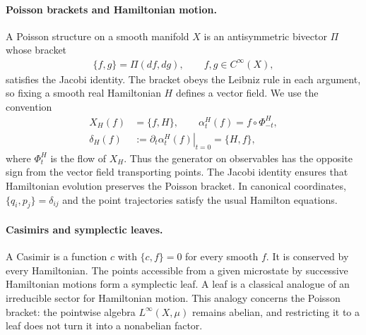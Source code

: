 \documentclass[a4paper,11pt]{article}
\theoremstyle{definition}
\theoremstyle{remark}
\begin{document}
\paragraph{Poisson brackets and Hamiltonian motion.}
A Poisson structure on a smooth manifold $X$ is an antisymmetric bivector $\Pi$ whose
bracket
\begin{align}
    \{f,g\}=\Pi(df,dg),\qquad f,g\in C^\infty(X),
\end{align}
satisfies the Jacobi identity.  The bracket obeys the Leibniz rule in each argument,
so fixing a smooth real Hamiltonian $H$ defines a vector field.  We use the convention
\begin{align}\label{eq:classical-Hamiltonian-convention}
    X_H(f)&=\{f,H\},\qquad
    \alpha_t^H(f)=f\circ\Phi_{-t}^H,\nonumber\\
    \delta_H(f)&:=\left.\partial_t\alpha_t^H(f)\right|_{t=0}=\{H,f\},
\end{align}
where $\Phi_t^H$ is the flow of $X_H$.  Thus the generator on observables has the
opposite sign from the vector field transporting points.  The Jacobi identity ensures
that Hamiltonian evolution preserves the Poisson bracket.  In canonical coordinates,
$\{q_i,p_j\}=\delta_{ij}$ and the point trajectories satisfy the usual Hamilton
equations.
 
\paragraph{Casimirs and symplectic leaves.}
A Casimir is a function $c$ with $\{c,f\}=0$ for every smooth $f$.  It is conserved
by every Hamiltonian.  The points accessible from a given microstate by successive
Hamiltonian motions form a symplectic leaf.  A leaf is a classical analogue of an
irreducible sector for Hamiltonian motion.  This analogy concerns the Poisson bracket:
the pointwise algebra $L^\infty(X,\mu)$ remains abelian, and restricting it to a leaf
does not turn it into a nonabelian factor.
 
\end{document}
